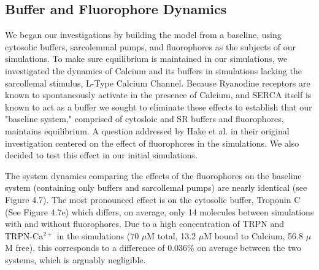 \documentclass[12pt]{ucsddissertation}
\begin{document}
\subsection{Buffer and Fluorophore Dynamics}
We began our investigations by building the model from a baseline, using cytosolic buffers, sarcolemmal pumps, and fluorophores as the subjects of our simulations. To make sure equilibrium is maintained in our simulations, we investigated the dynamics of Calcium and its buffers in simulations lacking the sarcollemal stimulus, L-Type Calcium Channel. Because Ryanodine receptors are known to spontaneously activate in the presence of Calcium\cite{Cheng1993,Cannell1995}, and SERCA itself is known to act as a buffer\cite{Higgins2006} we sought to eliminate these effects to establish that our "baseline system," comprised of cytosloic and SR buffers and fluorophores, maintains equilibrium. A question addressed by Hake et al. in their original investigation centered on the effect of fluorophores in the simulations. We also decided to test this effect in our initial simulations. 

The system dynamics comparing the effects of the fluorophores on the baseline system (containing only buffers and sarcollemal pumps) are nearly identical (see Figure 4.7). The most pronounced effect is on the cytosolic buffer, Troponin C (See Figure 4.7e) which differs, on average, only 14 molecules between simulations with and without fluorophores. Due to a high concentration of TRPN and TRPN-Ca$^{2+}$ in the simulations (70 $\mu$M total, 13.2 $\mu$M bound to Calcium, 56.8 $\mu$M free), this corresponds to a difference of 0.036\% on average between the two systems, which is arguably negligible. 
\end{document}
